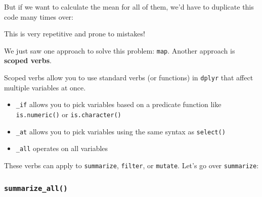 \documentclass[]{book}
\newenvironment{Shaded}{\begin{snugshade}}{\end{snugshade}}
\newcommand{\KeywordTok}[1]{\textcolor[rgb]{0.13,0.29,0.53}{\textbf{#1}}}
\newcommand{\DataTypeTok}[1]{\textcolor[rgb]{0.13,0.29,0.53}{#1}}
\newcommand{\StringTok}[1]{\textcolor[rgb]{0.31,0.60,0.02}{#1}}
\newcommand{\CommentTok}[1]{\textcolor[rgb]{0.56,0.35,0.01}{\textit{#1}}}
\newcommand{\OperatorTok}[1]{\textcolor[rgb]{0.81,0.36,0.00}{\textbf{#1}}}
\newcommand{\NormalTok}[1]{#1}
\providecommand{\tightlist}{%
  \setlength{\itemsep}{0pt}\setlength{\parskip}{0pt}}
\begin{document}
But if we want to calculate the mean for all of them, we'd have to
duplicate this code many times over:

\begin{Shaded}
\end{Shaded}

This is very repetitive and prone to mistakes!

We just saw one approach to solve this problem: \texttt{map}. Another
approach is \textbf{scoped verbs}.

Scoped verbs allow you to use standard verbs (or functions) in
\texttt{dplyr} that affect multiple variables at once.

\begin{itemize}
\tightlist
\item
  \texttt{\_if} allows you to pick variables based on a predicate
  function like \texttt{is.numeric()} or \texttt{is.character()}
\item
  \texttt{\_at} allows you to pick variables using the same syntax as
  \texttt{select()}
\item
  \texttt{\_all} operates on all variables
\end{itemize}

These verbs can apply to \texttt{summarize}, \texttt{filter}, or
\texttt{mutate}. Let's go over \texttt{summarize}:

\subsubsection*{\texorpdfstring{\texttt{summarize\_all()}}{summarize\_all()}}\label{summarize_all}
\end{document}
